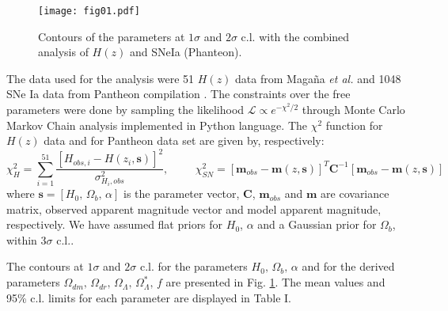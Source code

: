 \documentclass[preprintnumbers,amsmath,amssymb,nofootinbib]{revtex4}
\begin{document}
\begin{figure}
\centering
\texttt{[image: fig01.pdf]}
\caption{Contours of the parameters at $1\sigma$ and $2\sigma$ c.l. with the combined analysis of $H(z)$ and SNeIa (Phanteon).}
\label{fig015}
\end{figure} 

The data used for the analysis were 51 $H(z)$ data from Maga\~na {\it et al.} \cite{Magana2018} and 1048 SNe Ia data from Pantheon compilation \cite{pantheon}. The constraints over the free parameters were done by sampling the likelihood $\mathcal{L} \propto e^{-\chi^2/2}$ through Monte Carlo Markov Chain analysis implemented in {\sffamily Python} language. The $\chi^2$ function for $H(z)$ data and for Pantheon data set are given by, respectively:
\begin{equation}
\chi^2_H = \sum_{i = 1}^{51}\frac{{\left[ H_{obs,i} - H(z_i,\mathbf{s})\right] }^{2}}{\sigma^{2}_{H_i,obs}} ,\hspace{1cm} \chi^2_{SN} = \left[\bm{m}_{obs}-{\bm m}(z,\bm{s})\right]^T\bm{C}^{-1}\left[\bm{m}_{obs}-{\bm m}(z,\bm{s})\right]
\label{chi2SN}
\end{equation}
where $\mathbf{s}=[H_0,\,\Omega_b,\,\alpha]$ is the parameter vector, $\bm{C}$, $\bm{m}_{obs}$ and $\bm{m}$ are covariance matrix, observed apparent magnitude vector and model apparent magnitude, respectively. We have assumed flat priors for $H_0$, $\alpha$ and a Gaussian prior for $\Omega_b$, within $3\sigma$ c.l..

The contours at $1\sigma$ and $2\sigma$ c.l. for the parameters $H_0,\,\Omega_b,\,\alpha$ and for the derived parameters $\Omega_{dm},\,\Omega_{dr},\,\Omega_\Lambda,\,\Omega_\Lambda^*,\, f$ are presented in Fig. \ref{fig015}. The mean values and 95\% c.l.  limits for each parameter are displayed in Table I.
\end{document}
